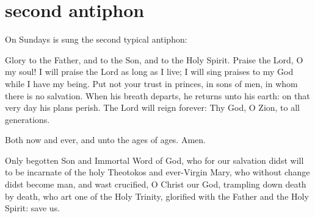 \section{second antiphon}

\begin{rubricmed}
    On Sundays is sung the second typical antiphon:
\end{rubricmed}

\begin{liturgicaltext}
    \choir Glory to the Father, and to the Son, and to the Holy Spirit. Praise the Lord, O my soul! I will praise the Lord as long as I live; I will sing praises to my God while I have my being. Put not your trust in princes, in sons of men, in whom there is no salvation. When his breath departs, he returns unto his earth: on that very day his plans perish. The Lord will reign forever: Thy God, O Zion, to all generations.
    \item[] Both now and ever, and unto the ages of ages. Amen.
    \item[] Only begotten Son and Immortal Word of God, who for our salvation didst will to be incarnate of the holy Theotokos and ever-Virgin Mary, who without change didst become man, and wast crucified, O Christ our God, trampling down death by death, who art one of the Holy Trinity, glorified with the Father and the Holy Spirit: save us.
\end{liturgicaltext}